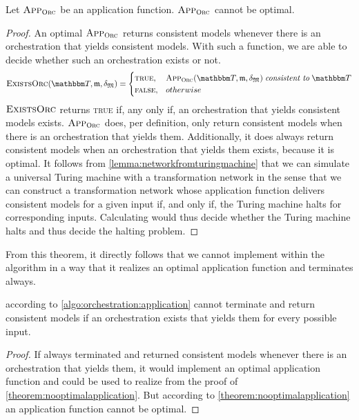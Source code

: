 \begin{theorem}
    \label{theorem:nooptimalapplication}
    Let $\textsc{App}_{\textsc{Orc}_{}}$ be an application function. $\textsc{App}_{\textsc{Orc}_{}}$ cannot be optimal.
\end{theorem}
\begin{proof}
    An optimal $\textsc{App}_{\textsc{Orc}_{}}$ returns consistent models whenever there is an orchestration that yields consistent models.
    With such a function, we are able to decide whether such an orchestration exists or not.
    \begin{align*}
        \function{ExistsOrc}(\transformationset{T},\modeltuple{m},\changetuple{\metamodeltuple{M}}) =
            \begin{cases}
                \textsc{true}, & \appfunction{\orcfunction{}}(\transformationset{T}, \modeltuple{m},\changetuple{\metamodeltuple{M}}) \consistenttomath \transformationset{T} \\
                \textsc{false}, & otherwise
            \end{cases}
    \end{align*}
    $\textsc{ExistsOrc}$ returns \textsc{true} if, any only if, an orchestration that yields consistent models exists.
    $\textsc{App}_{\textsc{Orc}_{}}$ does, per definition, only return consistent models when there is an orchestration that yields them.
    Additionally, it does always return consistent models when an orchestration that yields them exists, because it is optimal.
    It follows from \autoref{lemma:networkfromturingmachine} that we can simulate a universal Turing machine with a transformation network in the sense that we can construct a transformation network whose application function delivers consistent models for a given input if, and only if, the Turing machine halts for corresponding inputs.
    Calculating  would thus decide whether the Turing machine halts and thus decide the halting problem.
\end{proof}

From this theorem, it directly follows that we cannot implement  within the  algorithm in a way that it realizes an optimal application function and terminates always.

\begin{corollary}
     according to \autoref{algo:orchestration:application} cannot terminate and return consistent models if an orchestration exists that yields them for every possible input.
\end{corollary}
\begin{proof}
    If  always terminated and returned consistent models whenever there is an orchestration that yields them, it would implement an optimal application function and could be used to realize  from the proof of \autoref{theorem:nooptimalapplication}.
    But according to \autoref{theorem:nooptimalapplication} an application function cannot be optimal.
\end{proof}

